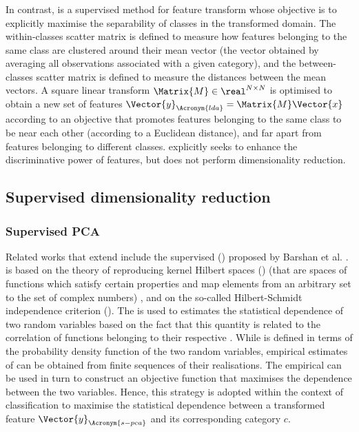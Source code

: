 \documentclass{article}
\def \fea{\Vector{x}} 	%
\def \nDim{N} 			%
\def \newFea{\Vector{y}} 	%
\def \cat{c} 			%
\begin{document}
\subsubsection{}
In contrast,  is a supervised method for feature transform whose objective is to explicitly maximise the separability of classes in the transformed domain. The within-classes scatter matrix is defined to measure how features belonging to the same class are clustered around their mean vector (the vector obtained by averaging all observations associated with a given category), and the  between-classes scatter matrix is defined to measure the distances between the mean vectors. A square linear transform $\Matrix{M} \in \real^{\nDim\times\nDim}$ is optimised to obtain a new set of features $\newFea_{\Acronym{lda}}=\Matrix{M}\fea$ according to an objective that promotes features belonging to the same class to be near each other (according to a Euclidean distance), and far apart from features belonging to different classes.  explicitly seeks to enhance the discriminative power of features, but does not perform dimensionality reduction.

\subsection{Supervised dimensionality reduction}
\subsubsection{Supervised PCA}
Related works that extend  include the supervised  () proposed by Barshan et al. \cite{Barshan2011Su}.  is based on the theory of reproducing kernel Hilbert spaces () (that are spaces of functions which satisfy certain properties and map elements from an arbitrary set to the set of complex numbers) \cite{Aronszajn:1950}, and on the so-called Hilbert-Schmidt independence criterion ()\cite{gretton2005measuring}. The  is used to estimates the statistical dependence of two random variables based on the fact that this quantity is related to the correlation of functions belonging to their respective . While  is defined in terms of the probability density function of the two random variables,  empirical estimates of  can be obtained from finite sequences of their realisations. The empirical  can be used in turn to construct an objective function that maximises the dependence between the two variables. Hence, this strategy is adopted within the context of classification to maximise the statistical dependence between a transformed feature $\newFea_{\Acronym{s-pca}}$ and its corresponding category $\cat$.
\end{document}
